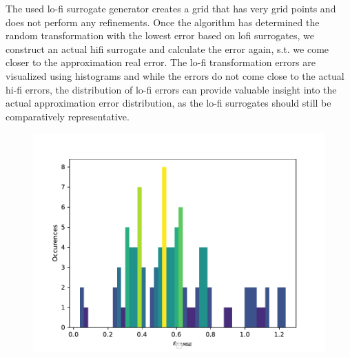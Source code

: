 \documentclass[
  a4paper,  %
  twoside,  %
  bibliography=totoc,
  headsepline,
  cleardoublepage=empty,
  parskip=half,
  draft=false
]{scrbook}
\begin{document}
The used lo-fi surrogate generator creates a grid that has very grid points and does not perform any refinements.
Once the algorithm has determined the random transformation with the lowest error based on lofi surrogates, we construct an actual hifi surrogate and calculate the error again, s.t. we come closer to the approximation real error.
The lo-fi transformation errors are visualized using histograms and while the errors do not come close to the actual hi-fi errors, the distribution of lo-fi errors can provide valuable insight into the actual approximation error distribution, as the lo-fi surrogates should still be comparatively representative.

\begin{mdframed}[style=style]
\begin{figure}[H]
        \centering
\begin{minipage}{.4\textwidth}
        \centering
\label{fig:aligned_grid}
    \end{minipage}%
    \begin{minipage}{0.6\textwidth}
        \centering
   \includegraphics[width=\linewidth]{graphics/random_hist_3}
    \end{minipage}
\end{figure}
\end{mdframed}
\end{document}
